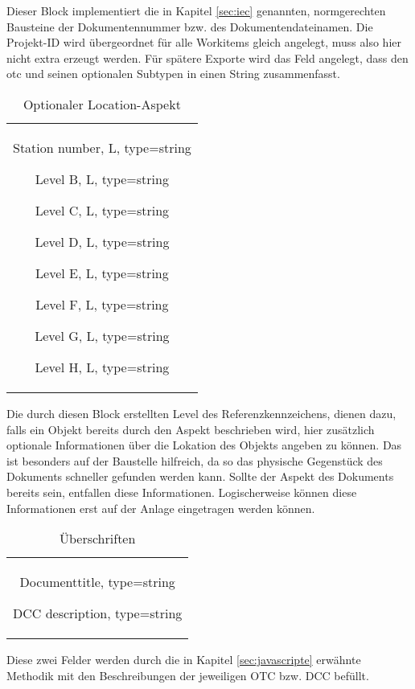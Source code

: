 %
Dieser Block implementiert die in Kapitel \ref{sec:iec} genannten, normgerechten Bausteine der Dokumentennummer bzw. des Dokumentendateinamen.
Die Projekt-ID wird übergeordnet für alle Workitems gleich angelegt, muss also hier nicht extra erzeugt werden. Für spätere Exporte wird das Feld  angelegt, dass den \ac{otc} und seinen optionalen Subtypen in einen String zusammenfasst.
\newpage
%
\begin{table}[H]
  \centering
  \begin{tabular}{c}
  \parbox{10cm}{
    \begin{compactitem}
 \item Station number, L, type=string
    \item Level B, L, type=string
    \item Level C, L, type=string
    \item Level D, L, type=string
    \item Level E, L, type=string
    \item Level F, L, type=string
    \item Level G, L, type=string
    \item Level H, L, type=string
\end{compactitem}}
  \end{tabular}
  \label{tab:third}
  \caption{Optionaler Location-Aspekt}
\end{table}
%
Die durch diesen Block erstellten Level des Referenzkennzeichens, dienen dazu, falls ein Objekt bereits durch den Aspekt  beschrieben wird, hier zusätzlich optionale Informationen über die Lokation des Objekts angeben zu können. Das ist besonders auf der Baustelle hilfreich, da so das physische Gegenstück des Dokuments schneller gefunden werden kann.
Sollte der Aspekt des Dokuments bereits  sein, entfallen diese Informationen. Logischerweise können diese Informationen erst auf der Anlage eingetragen werden können. 
%
\begin{table}[H]
  \centering
  \begin{tabular}{c}
  \parbox{10cm}{
   \begin{compactitem}
\item Documenttitle, type=string
    \item DCC description, type=string
\end{compactitem}}
  \end{tabular}
  \label{tab:fourth}
  \caption{Überschriften}
\end{table}
%
Diese zwei Felder werden durch die in Kapitel \ref{sec:javascripte} erwähnte Methodik mit den Beschreibungen der jeweiligen OTC bzw. DCC befüllt.
